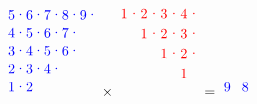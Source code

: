 \documentclass[a4paper,11pt]{amsart}
\begin{document}
			\begin{equation}
			\begin{tikzpicture}[blue, yscale=-0.45, xscale=0.45]
				\node at (0.5,0.5) {5};
				\node at (1.5,0.5) {6};
				\node at (2.5,0.5) {7};
				\node at (3.5,0.5) {8};
				\node at (4.5,0.5) {9};
				\node at (0.5,1.5) {4};
				\node at (1.5,1.5) {5};
				\node at (2.5,1.5) {6};
				\node at (3.5,1.5) {7};
				\node at (0.5,2.5) {3};
				\node at (1.5,2.5) {4};
				\node at (2.5,2.5) {5};
				\node at (3.5,2.5) {6};
				\node at (0.5,3.5) {2};
				\node at (1.5,3.5) {3};
				\node at (2.5,3.5) {4};
				\node at (0.5,4.5) {1};
				\node at (1.5,4.5) {2};
				\node at (1,0.5) {$\cdot$};
				\node at (2,0.5) {$\cdot$};
				\node at (3,0.5) {$\cdot$};
				\node at (4,0.5) {$\cdot$};
				\node at (5,0.5) {$\cdot$};
				\node at (1,1.5) {$\cdot$};
				\node at (2,1.5) {$\cdot$};
				\node at (3,1.5) {$\cdot$};
				\node at (4,1.5) {$\cdot$};
				\node at (1,2.5) {$\cdot$};
				\node at (2,2.5) {$\cdot$};
				\node at (3,2.5) {$\cdot$};
				\node at (4,2.5) {$\cdot$};
				\node at (1,3.5) {$\cdot$};
				\node at (2,3.5) {$\cdot$};
				\node at (3,3.5) {$\cdot$};
				\node at (1,4.5) {$\cdot$};
			\end{tikzpicture}\times
			\begin{tikzpicture}[red, xscale = 0.5, yscale=-0.5]
				\draw (0.5,0.5)  node{$1$};
				\draw (1.5,0.5)  node{$2$};
				\draw (2.5,0.5)  node{$3$};
				\draw (3.5,0.5)  node{$4$};
				\draw (1.5,1.5)  node{$1$};
				\draw (2.5,1.5)  node{$2$};
				\draw (3.5,1.5)  node{$3$};
				\draw (2.5,2.5)  node{$1$};
				\draw (3.5,2.5)  node{$2$};
				\draw (3.5,3.5)  node{$1$};
				\filldraw [opacity=0] (3,4) rectangle (3.3,4.6);
				\node at (1,0.5) {$\cdot$};
				\node at (2,0.5) {$\cdot$};
				\node at (3,0.5) {$\cdot$};
				\node at (4,0.5) {$\cdot$};
				\node at (2,1.5) {$\cdot$};
				\node at (3,1.5) {$\cdot$};
				\node at (4,1.5) {$\cdot$};
				\node at (3,2.5) {$\cdot$};
				\node at (4,2.5) {$\cdot$};
			\end{tikzpicture}
			=
			\begin{tikzpicture}[blue,yscale=-0.45, xscale=0.45]
				\node at (0.5,0.5) {9};
				\node at (1.5,0.5) {8};

\end{tikzpicture}
\end{equation}
\end{document}
